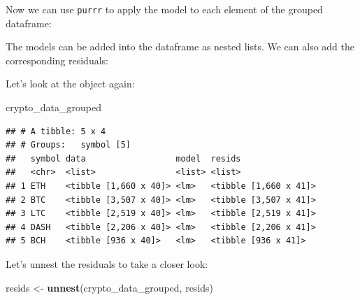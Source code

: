 \documentclass[
]{book}
\newenvironment{Shaded}{\begin{snugshade}}{\end{snugshade}}
\newcommand{\DataTypeTok}[1]{\textcolor[rgb]{0.13,0.29,0.53}{#1}}
\newcommand{\KeywordTok}[1]{\textcolor[rgb]{0.13,0.29,0.53}{\textbf{#1}}}
\newcommand{\NormalTok}[1]{#1}
\newcommand{\OperatorTok}[1]{\textcolor[rgb]{0.81,0.36,0.00}{\textbf{#1}}}
\newcommand{\StringTok}[1]{\textcolor[rgb]{0.31,0.60,0.02}{#1}}
\begin{document}
Now we can use \texttt{purrr}\citep{R-purrr} to apply the model to each element of the grouped dataframe:

\begin{Shaded}
\end{Shaded}

The models can be added into the dataframe as nested lists. We can also add the corresponding residuals:

\begin{Shaded}
\end{Shaded}

Let's look at the object again:

\begin{Shaded}
\begin{Highlighting}[]
\NormalTok{crypto_data_grouped}
\end{Highlighting}
\end{Shaded}

\begin{verbatim}
## # A tibble: 5 x 4
## # Groups:   symbol [5]
##   symbol data                  model  resids               
##   <chr>  <list>                <list> <list>               
## 1 ETH    <tibble [1,660 x 40]> <lm>   <tibble [1,660 x 41]>
## 2 BTC    <tibble [3,507 x 40]> <lm>   <tibble [3,507 x 41]>
## 3 LTC    <tibble [2,519 x 40]> <lm>   <tibble [2,519 x 41]>
## 4 DASH   <tibble [2,206 x 40]> <lm>   <tibble [2,206 x 41]>
## 5 BCH    <tibble [936 x 40]>   <lm>   <tibble [936 x 41]>
\end{verbatim}

Let's unnest the residuals to take a closer look:

\begin{Shaded}
\begin{Highlighting}[]
\NormalTok{resids <-}\StringTok{ }\KeywordTok{unnest}\NormalTok{(crypto_data_grouped, resids)}
\end{Highlighting}
\end{Shaded}
\end{document}
